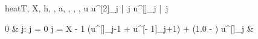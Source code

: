 \documentclass[12pt,a4paper]{book}
\begin{document}

\begin{eqcode}{heat}{T, X, h, \tau, a}{, , ,
, }{}
  u \in {} \lend
  u^{[2]}_j |\ \forall j \gets \iter \lend %
  u^{[\iter]}_j |\ \forall j \quad \; \; \gets 
  \begin{cases}
    0 & j: j = 0 \cup j = X - 1 \lend
   \cdot (u^{[]}_{j-1} +
    u^{[\iter - 1]}_{j+1}) + (1.0 - ) \cdot
    u^{[]}_j & \otherwise \lend
  \end{cases} \lend
   \lend
\end{eqcode}
\end{document}
